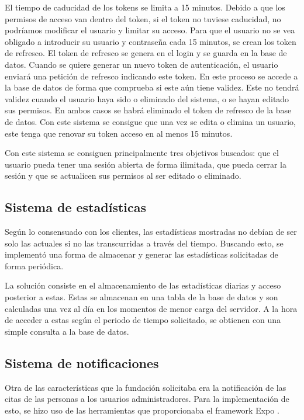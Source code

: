 El tiempo de caducidad de los tokens se limita a 15 minutos. Debido a que los permisos de acceso van dentro del token, si el token no tuviese caducidad, no podríamos modificar el usuario y limitar su acceso. Para que el usuario no se vea obligado a introducir su usuario y contraseña cada 15 minutos, se crean los token de refresco. El token de refresco se genera en el login y se guarda en la base de datos. Cuando se quiere generar un nuevo token de autenticación, el usuario enviará una petición de refresco indicando este token. En este proceso se accede a la base de datos de forma que comprueba si este aún tiene validez. Este no tendrá validez cuando el usuario haya sido o eliminado del sistema, o se hayan editado sus permisos. En ambos casos se habrá eliminado el token de refresco de la base de datos. Con este sistema se consigue que una vez se edita o elimina un usuario, este tenga que renovar su token acceso en al menos 15 minutos. 

Con este sistema se consiguen principalmente tres objetivos buscados: que el usuario pueda tener una sesión abierta de forma ilimitada, que pueda cerrar la sesión y que se actualicen sus permisos al ser editado o eliminado.

\subsection{Sistema de estadísticas}

Según lo consensuado con los clientes, las estadísticas mostradas no debían de ser solo las actuales si no las transcurridas a través del tiempo. Buscando esto, se implementó una forma de almacenar y generar las estadísticas solicitadas de forma periódica. 

La solución consiste en el almacenamiento de las estadísticas diarias y acceso posterior a estas. Estas se almacenan en una tabla de la base de datos y son calculadas una vez al día en los momentos de menor carga del servidor. A la hora de acceder a estas según el periodo de tiempo solicitado, se obtienen con una simple consulta a la base de datos. 

\subsection{Sistema de notificaciones}

Otra de las características que la fundación solicitaba era la notificación de las citas de las personas a los usuarios administradores. Para la implementación de esto, se hizo uso de las herramientas que proporcionaba el framework Expo \cite{expo-notifications}. 

